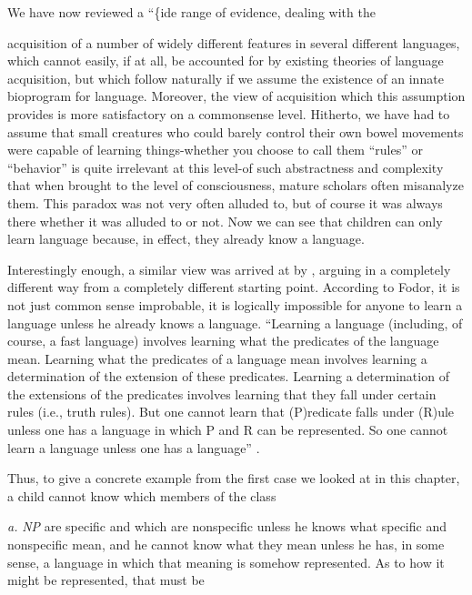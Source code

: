 We have now reviewed a ``\{ide range of evidence, dealing with the


acquisition of a number of widely different features in several different languages, which cannot easily, if at all, be accounted for by existing theories of language acquisition, but which follow naturally if we assume the existence of an innate bioprogram for language. Moreover, the view of acquisition which this assumption provides is more satis\-factory on a commonsense level. Hitherto, we have had to assume that small creatures who could barely control their own bowel move\-ments were capable of learning things-whether you choose to call them ``rules'' or ``behavior'' is quite irrelevant at this level{}-of such abstract\-ness and complexity that when brought to the level of consciousness, mature scholars often misanalyze them. This paradox was not very often alluded to, but of course it was always there whether it was alluded to or not. Now we can see that children can only learn language because, in effect, they already know a language.

Interestingly enough, a similar view was arrived at by \citet{Fodor1975}, arguing in a completely different way from a completely different starting point. According to Fodor, it is not just common sense improbable, it is logically impossible for anyone to learn a lan\-guage unless he already knows a language. ``Learning a language (includ\-ing, of course, a fast language) involves learning what the predicates of the language mean. Learning what the predicates of a language mean involves learning a determination of the extension of these predicates. Learning a determination of the extensions of the predicates involves learning that they fall under certain rules (i.e., truth rules). But one cannot learn that (P)redicate falls under (R)ule unless one has a lan\-guage in which P and R can be represented. So one cannot learn a language unless one has a language'' \citep[63-64]{Fodor1975}.

Thus, to give a concrete example from the first case we looked at in this chapter, a child cannot know which members of the class

\textit{a.} \textit{NP} are specific and which are nonspecific unless he knows what specific and nonspecific mean, and he cannot know what they mean unless he has, in some sense, a language in which that meaning is some\-how represented. As to how it might be represented, that must be

